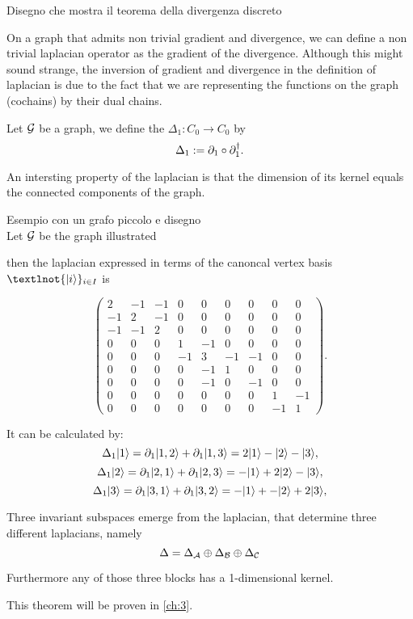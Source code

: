 \documentclass[../2.tex]{subfiles}
\begin{document}
    {\color{red} Disegno che mostra il teorema della divergenza discreto}

    On a graph that admits non trivial gradient and divergence, we can define a non trivial laplacian operator as the gradient of the divergence.
    Although this might sound strange, the inversion of gradient and divergence in the definition of laplacian is due to the fact that we are representing
    the functions on the graph (cochains) by their dual chains.

    \begin{defn}
        Let $\mathcal{G}$ be a graph, we define the  $\Delta_1 : C_0 \to C_0$ by 
        \[ \Delta_1 := \partial_1 \circ \partial^\dagger_1.\]
    \end{defn}

    An intersting property of the laplacian is that the dimension of its kernel equals the connected components of the graph.

    {\color{red} Esempio con un grafo piccolo e disegno \\

    Let $\mathcal{G}$ be the graph illustrated 
    
    then the laplacian expressed in terms of the canoncal vertex basis $¬\{\ket{i}\}_{i \in I}$ is

    \[\begin{pmatrix}
            2 & -1 & -1 & 0 & 0 & 0 & 0 & 0 & 0 \\
            -1 & 2 & -1 & 0 & 0 & 0 & 0 & 0 & 0 \\
            -1 & -1 & 2 & 0 & 0 & 0 & 0 & 0 & 0 \\
            0 & 0 & 0 & 1 & -1 & 0 & 0 & 0 & 0 \\
            0 & 0 & 0 & -1 & 3 & -1 & -1 & 0 & 0 \\
            0 & 0 & 0 & 0 & -1 & 1 & 0 & 0 & 0 \\
            0 & 0 & 0 & 0 & -1 & 0 & -1 & 0 & 0 \\
            0 & 0 & 0 & 0 & 0 & 0 & 0 & 1 & -1 \\
            0 & 0 & 0 & 0 & 0 & 0 & 0 & -1 & 1 
        \end{pmatrix}. \] 

    It can be calculated by:
    \[ \Delta_1 | 1 \rangle = \partial_1| 1,2 \rangle + \partial_1| 1,3 \rangle = 2| 1 \rangle-| 2 \rangle-| 3 \rangle,\]
    \[ \Delta_1 | 2 \rangle = \partial_1| 2,1 \rangle + \partial_1| 2,3 \rangle = -| 1 \rangle+2| 2 \rangle-| 3 \rangle,\]
    \[ \Delta_1 | 3 \rangle = \partial_1| 3,1 \rangle + \partial_1| 3,2 \rangle = -| 1 \rangle+-| 2 \rangle+2| 3 \rangle,\]

    Three invariant subspaces emerge from the laplacian, that determine three different laplacians, namely
    \[ \Delta = \Delta_{\mathcal{A}} \oplus \Delta_{\mathcal{B}} \oplus \Delta_{\mathcal{C}} \]

    Furthermore any of those three blocks has a 1-dimensional kernel.
        
        
        }

    This theorem will be proven in \autoref{ch:3}.
\end{document}
